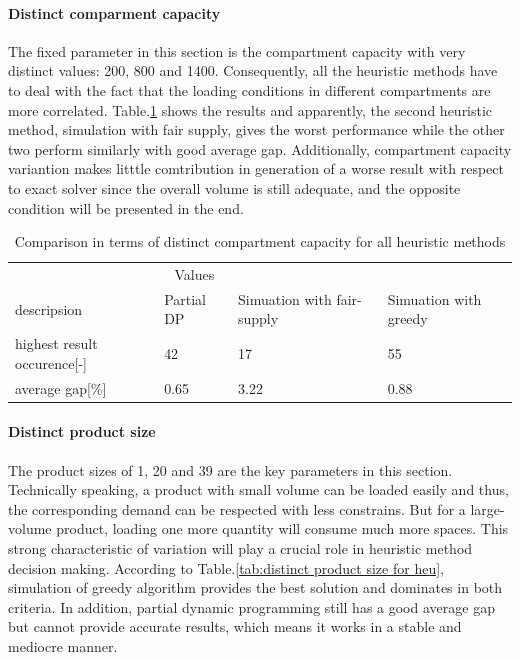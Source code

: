 \documentclass{article}
\begin{document}
\paragraph{Distinct comparment capacity}
The fixed parameter in this section is the compartment capacity with very distinct values: 200, 800 and 1400. Consequently, all the heuristic methods have to deal with the fact that the loading conditions in different compartments are more correlated. Table.\ref{tab:distinct compartment capacity for heu} shows the results and apparently, the second heuristic method, simulation with fair supply, gives the worst performance while the other two perform similarly with good average gap. Additionally, compartment capacity variantion makes litttle comtribution in generation of a worse result with respect to exact solver since the overall volume is still adequate, and the opposite condition will be presented in the end.

\begin{table}[ht]
 \caption{Comparison in terms of distinct compartment capacity for all heuristic methods}
  \centering
  \begin{tabular}{llll}
    \toprule
    \multicolumn{3}{c}{Values}                   \\
    \cmidrule(r){2-3}
    descripsion   & Partial DP    & Simuation with fair-supply      & Simuation with greedy \\
    \midrule
    highest result occurence[-]	&	42 	&	17 	&	55 	\\
    average gap[\%]	&	0.65 	&	3.22 	&	0.88 	\\
    \bottomrule
  \end{tabular}
  \label{tab:distinct compartment capacity for heu}
\end{table}

\paragraph{Distinct product size}
The product sizes of 1, 20 and 39 are the key parameters in this section. Technically speaking, a product with small volume can be loaded easily and thus, the corresponding demand can be respected with less constrains. But for a large-volume product, loading one more quantity will consume much more spaces. This strong characteristic of variation will play a crucial role in heuristic method decision making. According to Table.\ref{tab:distinct product size for heu}, simulation of greedy algorithm provides the best solution and dominates in both criteria. In addition, partial dynamic programming still has a good average gap but cannot provide accurate results, which means it works in a stable and mediocre manner. 
\end{document}
